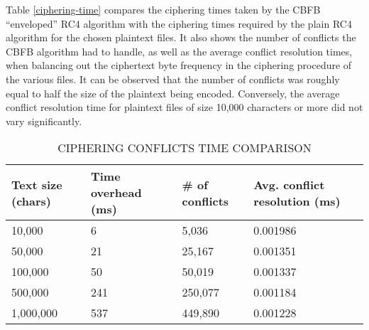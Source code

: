 \documentclass[conference]{IEEEtran}
\begin{document}
Table \ref{ciphering-time} compares the ciphering times taken by the CBFB “enveloped” RC4 algorithm with the ciphering times required by the plain RC4 algorithm for the chosen plaintext files. It also shows the number of conflicts the CBFB algorithm had to handle, as well as the average conflict resolution times, when balancing out the ciphertext byte frequency in the ciphering procedure of the various files. It can be observed that the number of conflicts was roughly equal to half the size of the plaintext being encoded. Conversely, the average conflict resolution time for plaintext files of size 10,000 characters or more did not vary significantly.

\begin{table}[h]
\centering
\begin{tabular}{|l|l|l|l|}
\hline
Text size (chars) & Time overhead (ms) & \# of conflicts & Avg. conflict resolution (ms)\\ \hline
10,000                                                       & 6                                                            & 5,036           & 0.001986                                                                \\ \hline
50,000                                                       & 21                                                           & 25,167          & 0.001351                                                                \\ \hline
100,000                                                      & 50                                                           & 50,019          & 0.001337                                                                \\ \hline
500,000                                                      & 241                                                          & 250,077         & 0.001184                                                                \\ \hline
1,000,000                                                    & 537                                                          & 449,890         & 0.001228                                                                \\ \hline
\end{tabular}
\caption{CIPHERING CONFLICTS TIME COMPARISON}
\label{conflict-time}
\end{table}
\end{document}
